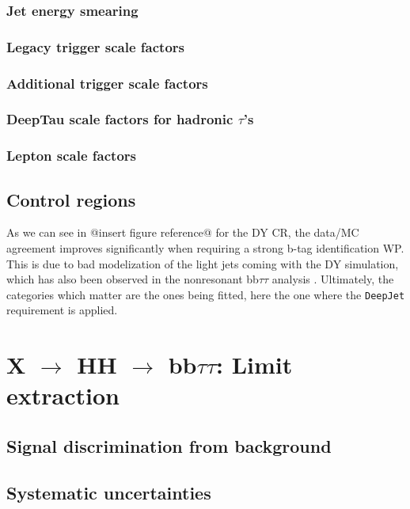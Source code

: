 \documentclass[11pt]{article}
\newcommand{\bbtt}{bb$\tau\tau$}
\newcommand{\reshhbbtt}{X $\rightarrow$ HH $\rightarrow$ bb$\tau\tau$}
\begin{document}
\subsubsection{Jet energy smearing}
\label{sec:orgf27b084}
\subsubsection{Legacy trigger scale factors}
\label{sec:orgdffb1f0}
\subsubsection{Additional trigger scale factors}
\label{sec:orgf92250b}
\subsubsection{DeepTau scale factors for hadronic \(\tau\)'s}
\label{sec:orgfc369ec}
\subsubsection{Lepton scale factors}
\label{sec:org95b0c7f}

\subsection{Control regions}
\label{sec:org76f6098}
As we can see in @insert figure reference@ for the \ac{DY} \ac{CR}, the data/MC agreement improves significantly when requiring a strong b-tag identification \ac{WP}.
This is due to bad modelization of the light jets coming with the \ac{DY} simulation, which has also been observed in the nonresonant \bbtt{} analysis \cite{higgs_bbtautau_nonres}.
Ultimately, the categories which matter are the ones being fitted, here the one where the \texttt{DeepJet} requirement is applied.


\section{\reshhbbtt{}: Limit extraction}
\label{sec:orgf930406}
\subsection{Signal discrimination from background}
\label{sec:orga199051}
\subsection{Systematic uncertainties}
\label{sec:orgd908ff6}
\end{document}

